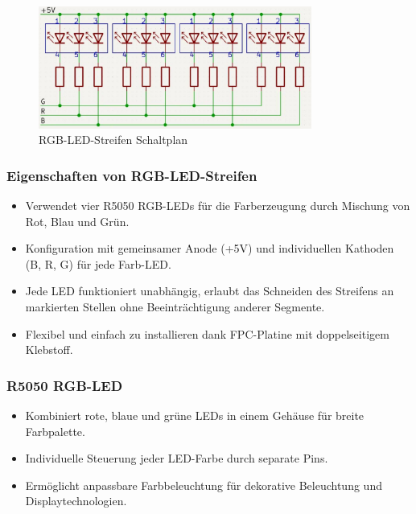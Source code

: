 \documentclass{vorlage-design-main}
\begin{document}
\begin{figure}
\centering
\includegraphics[width=0.8\textwidth]{images/rgb_strip_sche.pdf}
\floatnotes{}
\caption{RGB-LED-Streifen Schaltplan}
\end{figure}

\hypertarget{eigenschaften-von-rgb-led-streifen}{%
\subsubsection{Eigenschaften von
RGB-LED-Streifen}\label{eigenschaften-von-rgb-led-streifen}}

\begin{itemize}

\item
  Verwendet vier R5050 RGB-LEDs für die Farberzeugung durch Mischung von
  Rot, Blau und Grün.
\item
  Konfiguration mit gemeinsamer Anode (+5V) und individuellen Kathoden
  (B, R, G) für jede Farb-LED.
\item
  Jede LED funktioniert unabhängig, erlaubt das Schneiden des Streifens
  an markierten Stellen ohne Beeinträchtigung anderer Segmente.
\item
  Flexibel und einfach zu installieren dank FPC-Platine mit
  doppelseitigem Klebstoff.
\end{itemize}

\hypertarget{r5050-rgb-led}{%
\subsubsection{R5050 RGB-LED}\label{r5050-rgb-led}}

\begin{itemize}

\item
  Kombiniert rote, blaue und grüne LEDs in einem Gehäuse für breite
  Farbpalette.
\item
  Individuelle Steuerung jeder LED-Farbe durch separate Pins.
\item
  Ermöglicht anpassbare Farbbeleuchtung für dekorative Beleuchtung und
  Displaytechnologien.
\end{itemize}
\end{document}
